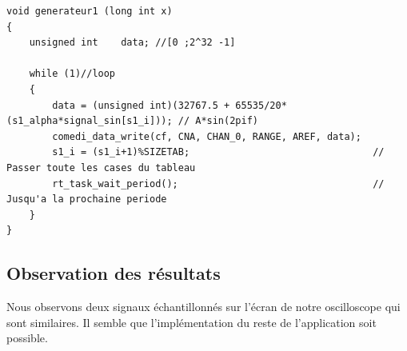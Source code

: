 \begin{lstlisting}[style = customc]
void generateur1 (long int x)
{
	unsigned int 	data; //[0 ;2^32 -1]

	while (1)//loop
	{  
	  	data = (unsigned int)(32767.5 + 65535/20*(s1_alpha*signal_sin[s1_i])); // A*sin(2pif)
	  	comedi_data_write(cf, CNA, CHAN_0, RANGE, AREF, data);
	  	s1_i = (s1_i+1)%SIZETAB;								// Passer toute les cases du tableau
	  	rt_task_wait_period();									// Jusqu'a la prochaine periode
	}
}
\end{lstlisting}

\subsection{Observation des résultats}
Nous observons deux signaux échantillonnés sur l'écran de notre oscilloscope qui sont similaires. Il semble que l'implémentation du reste de l'application soit possible. 